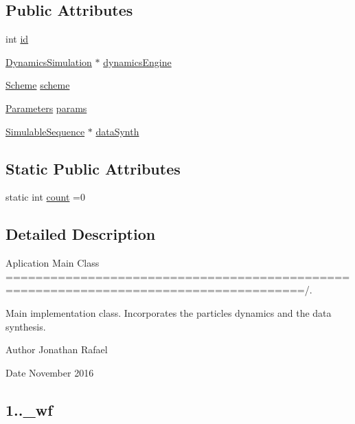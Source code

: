 \subsection*{Public Attributes}
\begin{DoxyCompactItemize}
\item 
int \hyperlink{class_m_c_simulation_aff828a83a905ae188146d3ffaa12a1bc}{id}
\item 
\hyperlink{class_dynamics_simulation}{Dynamics\+Simulation} $\ast$ \hyperlink{class_m_c_simulation_ac453455b2dfb994b7b1a4b7823bd3dc9}{dynamics\+Engine}
\item 
\hyperlink{class_scheme}{Scheme} \hyperlink{class_m_c_simulation_a87ba6332f1f49024a442981b477360c4}{scheme}
\item 
\hyperlink{class_parameters}{Parameters} \hyperlink{class_m_c_simulation_aecb8470cb31fa67e38c5d5acd5a80bef}{params}
\item 
\hyperlink{class_simulable_sequence}{Simulable\+Sequence} $\ast$ \hyperlink{class_m_c_simulation_a7e2496127af6436d64bca7f52bc40c82}{data\+Synth}
\end{DoxyCompactItemize}
\subsection*{Static Public Attributes}
\begin{DoxyCompactItemize}
\item 
static int \hyperlink{class_m_c_simulation_aa3853b6cec83b055593cbf58def0c164}{count} =0
\end{DoxyCompactItemize}


\subsection{Detailed Description}
Aplication Main Class ======================================================================================/. 

Main implementation class. Incorporates the particle\textquotesingle{}s dynamics and the data synthesis. \begin{DoxyAuthor}{Author}
Jonathan Rafael 
\end{DoxyAuthor}
\begin{DoxyDate}{Date}
November 2016 \subsection*{1..\+\_\+wf }
\end{DoxyDate}


